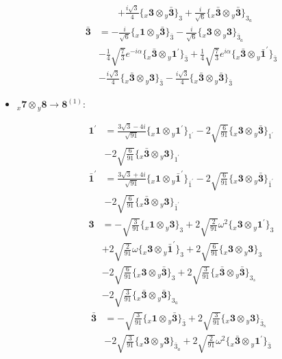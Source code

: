 \documentclass[english]{article}
\newcommand{\rep}[1]{\mathbf{#1}}
\newcommand{\repx}[2]{{}_{#2}\mathbf{#1}}
\newcommand{\tsprodx}[2]{\repx{#1}{x}\otimes\repx{#2}{y}}
\newcommand{\subcgt}[3]{\big\{ \tsprodx{#1}{#2}\big\}^{}_{#3}}
\begin{document}
\begin{itemize}
\begin{fleqn}
\begin{align*}
 & +\frac{i \sqrt{3}}{4}\subcgt{3}{\bar{3}}{3}+\frac{i}{\sqrt{6}}\subcgt{\bar{3}}{\bar{3}}{3_{a}}
\end{align*}
\begin{align*}
\rep{\bar{3}} & = -\frac{i}{\sqrt{6}}\subcgt{1}{\bar{3}}{\bar{3}}-\frac{i}{\sqrt{6}}\subcgt{3}{3}{\bar{3}_{a}} \\ 
 & -\frac{1}{4} \sqrt{\frac{7}{3}} e^{-i \alpha }\subcgt{\bar{3}}{1^{\prime}}{\bar{3}}+\frac{1}{4} \sqrt{\frac{7}{3}} e^{i \alpha }\subcgt{\bar{3}}{\bar{1}^{\prime}}{\bar{3}} \\ 
 & -\frac{i \sqrt{3}}{4}\subcgt{\bar{3}}{3}{\bar{3}}-\frac{i \sqrt{3}}{4}\subcgt{\bar{3}}{\bar{3}}{\bar{3}}
\end{align*}
\end{fleqn}
\item $\tsprodx{7}{8}\to\rep{8}^{(1)}$:
\begin{fleqn}
\begin{align*}
\rep{1^{\prime}} & = \frac{3 \sqrt{3}-4 i}{\sqrt{91}}\subcgt{1}{1^{\prime}}{1^{\prime}}-2 \sqrt{\frac{6}{91}}\subcgt{3}{\bar{3}}{1^{\prime}} \\ 
 & -2 \sqrt{\frac{6}{91}}\subcgt{\bar{3}}{3}{1^{\prime}}
\end{align*}
\begin{align*}
\rep{\bar{1}^{\prime}} & = \frac{3 \sqrt{3}+4 i}{\sqrt{91}}\subcgt{1}{\bar{1}^{\prime}}{\bar{1}^{\prime}}-2 \sqrt{\frac{6}{91}}\subcgt{3}{\bar{3}}{\bar{1}^{\prime}} \\ 
 & -2 \sqrt{\frac{6}{91}}\subcgt{\bar{3}}{3}{\bar{1}^{\prime}}
\end{align*}
\begin{align*}
\rep{3} & = -\sqrt{\frac{3}{91}}\subcgt{1}{3}{3}+2 \sqrt{\frac{2}{91}} \omega ^2\subcgt{3}{1^{\prime}}{3} \\ 
 & +2 \sqrt{\frac{2}{91}} \omega\subcgt{3}{\bar{1}^{\prime}}{3}+2 \sqrt{\frac{6}{91}}\subcgt{3}{3}{3} \\ 
 & -2 \sqrt{\frac{6}{91}}\subcgt{3}{\bar{3}}{3}+2 \sqrt{\frac{3}{91}}\subcgt{\bar{3}}{\bar{3}}{3_{s}} \\ 
 & -2 \sqrt{\frac{3}{91}}\subcgt{\bar{3}}{\bar{3}}{3_{a}}
\end{align*}
\begin{align*}
\rep{\bar{3}} & = -\sqrt{\frac{3}{91}}\subcgt{1}{\bar{3}}{\bar{3}}+2 \sqrt{\frac{3}{91}}\subcgt{3}{3}{\bar{3}_{s}} \\ 
 & -2 \sqrt{\frac{3}{91}}\subcgt{3}{3}{\bar{3}_{a}}+2 \sqrt{\frac{2}{91}} \omega ^2\subcgt{\bar{3}}{1^{\prime}}{\bar{3}} \\ 

\end{align*}
\end{fleqn}
\end{itemize}
\end{document}
